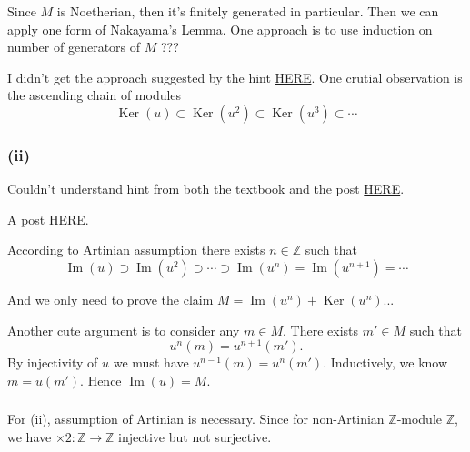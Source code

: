 Since $M$ is Noetherian, then it's finitely generated in particular. 
Then we can apply one form of Nakayama's Lemma.
One approach is to use induction on number of generators of $M$ ??? 

I didn't get the approach suggested by the hint \href{https://math.stackexchange.com/questions/145310/proving-that-surjective-endomorphisms-of-noetherian-modules-are-isomorphisms-and}{HERE}.
One crutial observation is the ascending chain of modules
$$\operatorname{Ker}(u)\subset\operatorname{Ker}(u^2)\subset\operatorname{Ker}(u^3)\subset\cdots$$

\subsubsection{(ii)}

Couldn't understand hint from both the textbook and the post \href{https://math.stackexchange.com/questions/145310/proving-that-surjective-endomorphisms-of-noetherian-modules-are-isomorphisms-and}{HERE}. 

A post \href{https://math.stackexchange.com/questions/273181/if-m-is-an-artinian-module-and-f-m-to-m-is-an-injective-homomorphism-then}{HERE}.

According to Artinian assumption there exists $n\in \mathbb Z$ such that 
$$\operatorname{Im}(u)\supset\operatorname{Im}(u^2)\supset\cdots\supset \operatorname{Im}(u^n)=\operatorname{Im}(u^{n+1})=\cdots$$

And we only need to prove the claim $M=\operatorname{Im}(u^n)+\operatorname{Ker}(u^n)$... 

Another cute argument is to consider any $m\in M$. There exists $m'\in M$ such that 
$$u^n(m)=u^{n+1}(m').$$
By injectivity of $u$ we must have $u^{n-1}(m)=u^n(m')$. Inductively, we know $m=u(m')$. Hence $\operatorname{Im}(u)=M$.

\subsubsection{}
For (ii), assumption of Artinian is necessary. Since for non-Artinian $\mathbb Z$-module $\mathbb Z$, we have $\times 2:\mathbb Z\to \mathbb Z$ injective but not surjective.